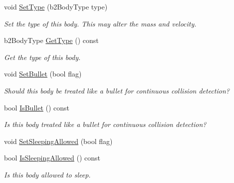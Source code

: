\begin{DoxyCompactItemize}
\mbox{\label{classb2Body_a34ff1c84b10b74eb990749a025a1b1ad}} 
void \mbox{\hyperlink{classb2Body_a34ff1c84b10b74eb990749a025a1b1ad}{Set\+Type}} (b2\+Body\+Type type)
\begin{DoxyCompactList}\small\item\em Set the type of this body. This may alter the mass and velocity. \end{DoxyCompactList}\item 
\mbox{\label{classb2Body_a9c2234b5a5fff91305a65ecd0cf0ee59}} 
b2\+Body\+Type \mbox{\hyperlink{classb2Body_a9c2234b5a5fff91305a65ecd0cf0ee59}{Get\+Type}} () const
\begin{DoxyCompactList}\small\item\em Get the type of this body. \end{DoxyCompactList}\item 
\mbox{\label{classb2Body_a3253af3725b8d6d63d8223bcd2ddab5c}} 
void \mbox{\hyperlink{classb2Body_a3253af3725b8d6d63d8223bcd2ddab5c}{Set\+Bullet}} (bool flag)
\begin{DoxyCompactList}\small\item\em Should this body be treated like a bullet for continuous collision detection? \end{DoxyCompactList}\item 
\mbox{\label{classb2Body_ad99db1c7a19e8de333ff7f65b0b953f4}} 
bool \mbox{\hyperlink{classb2Body_ad99db1c7a19e8de333ff7f65b0b953f4}{Is\+Bullet}} () const
\begin{DoxyCompactList}\small\item\em Is this body treated like a bullet for continuous collision detection? \end{DoxyCompactList}\item 
void \mbox{\hyperlink{classb2Body_a229a6de228416203fecbf7a7544c33bb}{Set\+Sleeping\+Allowed}} (bool flag)
\item 
\mbox{\label{classb2Body_ac47251de3a8c0ccff620be7bd5ae696a}} 
bool \mbox{\hyperlink{classb2Body_ac47251de3a8c0ccff620be7bd5ae696a}{Is\+Sleeping\+Allowed}} () const
\begin{DoxyCompactList}\small\item\em Is this body allowed to sleep. \end{DoxyCompactList}\item 

\end{DoxyCompactItemize}
